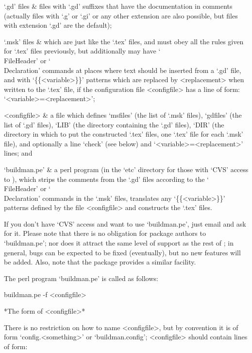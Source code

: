 \beginitems

`.gd' files &
{\GAP} files with `.gd' suffixes that have the documentation in  comments
(actually files with `.g' or  `.gi'  or  any  other  extension  are  also
possible, but files with extension `.gd' are the default);

`.msk' files &
which are just like the `.tex' files, and must obey all the  rules  given
for `.tex' files previously, but additionally may have `\\FileHeader'  or
`\\Declaration' commands at places where text should be inserted  from  a
`.gd' file, and with `\{\{<variable>\}\}' patterns which are replaced  by
<replacement> when written to the `.tex' file, if the configuration  file
<configfile> has a line of form: `<variable>=<replacement>';

<configfile> &
a file which defines `msfiles' (the list of `.msk' files), `gdfiles' (the
list of `.gd' files), `LIB' (the directory containing the  `.gd'  files),
`DIR' (the directory in which to put the constructed  `.tex'  files,  one
`.tex' file for each `.msk' file), and optionally  a  line  `check'  (see
below) and `<variable>=<replacement>' lines; and

`buildman.pe' &
a perl program (in the `etc' directory for those  with  `CVS'  access  to
{\GAP}), which strips the comments from the `.gd' files according to  the
`\\FileHeader'  or  `\\Declaration'  commands  in   the   `.msk'   files,
translates  any  `\{\{<variable>\}\}'  patterns  defined  by   the   file
<configfile> and constructs the `.tex' files.

\enditems

If you don't have `CVS' access and want to use `buildman.pe', just  email
 and ask for it.  Please  note  that
there is no obligation for package authors to `buildman.pe'; nor does  it
attract the same level of support as the rest of {\GAP}; in general, bugs
can be expected to be fixed (eventually), but no  new  features  will  be
added. Also, note that the  package  provides  a  similar
facility.

The perl program `buildman.pe' is called as follows:

buildman.pe -f <configfile>

*The form of <configfile>*

There is no restriction on how to name <configfile>, but by convention it
is of form `config.<something>' or `buildman.config'; <configfile> should
contain lines of form:

